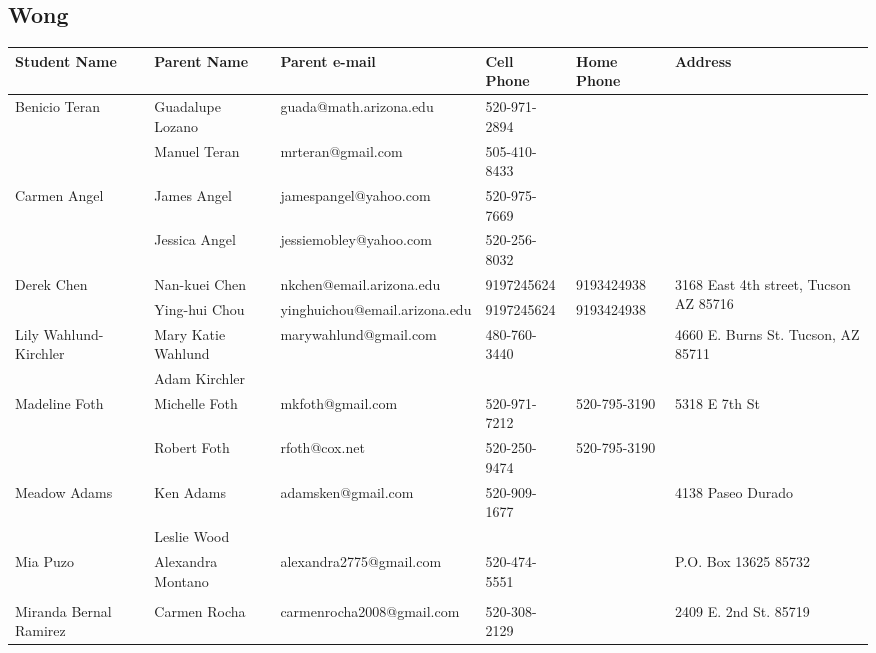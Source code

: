 \documentclass[landscape]{article}\usepackage[]{graphicx}\usepackage[]{color}
\begin{document}
\subsection{Wong}
\begin{longtable}{|p{100pt}|p{100pt}|p{140pt}|p{60pt}|p{64pt}|p{120pt}|}
\textbf{Student Name} & \textbf{Parent Name} & \textbf{Parent e-mail} & \textbf{Cell Phone} & \textbf{Home Phone} & \textbf{Address}\\
\hline
\hline
\multirow{2}{100pt}{Benicio Teran} & Guadalupe Lozano & guada@math.arizona.edu & 520-971-2894 &  & \multirow{2}{120pt}{} \\
 & Manuel Teran & mrteran@gmail.com & 505-410-8433 &  & \\
\hline
\multirow{2}{100pt}{Carmen Angel} & James Angel & jamespangel@yahoo.com & 520-975-7669 &  & \multirow{2}{120pt}{} \\
 & Jessica Angel & jessiemobley@yahoo.com & 520-256-8032 &  & \\
\hline
\multirow{2}{100pt}{Derek Chen} & Nan-kuei Chen & nkchen@email.arizona.edu & 9197245624 & 9193424938 & \multirow{2}{120pt}{3168 East 4th street, Tucson AZ 85716} \\
 & Ying-hui Chou & yinghuichou@email.arizona.edu & 9197245624 & 9193424938 & \\
\hline
\multirow{2}{100pt}{Lily Wahlund-Kirchler} & Mary Katie Wahlund & marywahlund@gmail.com & 480-760-3440 &  & \multirow{2}{120pt}{4660 E. Burns St. Tucson, AZ 85711} \\
 & Adam Kirchler &  &  &  & \\
\hline
\multirow{2}{100pt}{Madeline Foth} & Michelle Foth & mkfoth@gmail.com & 520-971-7212 & 520-795-3190 & \multirow{2}{120pt}{5318 E 7th St} \\
 & Robert Foth & rfoth@cox.net & 520-250-9474 & 520-795-3190 & \\
\hline
\multirow{2}{100pt}{Meadow Adams} & Ken Adams & adamsken@gmail.com & 520-909-1677 &  & \multirow{2}{120pt}{4138 Paseo Durado} \\
 & Leslie Wood &  &  &  & \\
\hline
\multirow{2}{100pt}{Mia Puzo} & Alexandra Montano & alexandra2775@gmail.com & 520-474-5551 &  & \multirow{2}{120pt}{P.O. Box 13625    85732} \\
 &  &  &  &  & \\
\hline
\multirow{2}{100pt}{Miranda Bernal Ramirez} & Carmen Rocha & carmenrocha2008@gmail.com & 520-308-2129 &  & \multirow{2}{120pt}{2409 E. 2nd St. 85719} \\

\end{longtable}
\end{document}
